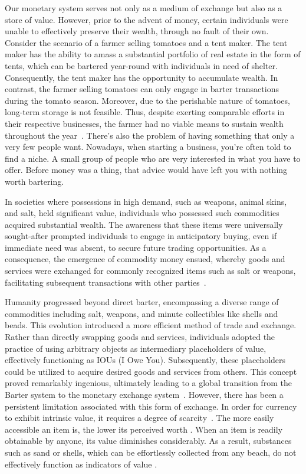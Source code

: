 Our monetary system serves not only as a medium of exchange but also as a store of value. However, prior to the advent of money, certain
individuals were unable to effectively preserve their wealth, through no fault of their own. Consider the scenario of a farmer selling tomatoes
and a tent maker. The tent maker has the ability to amass a substantial portfolio of real estate in the form of tents, which can be bartered
year-round with individuals in need of shelter. Consequently, the tent maker has the opportunity to accumulate wealth. In contrast, the farmer
selling tomatoes can only engage in barter transactions during the tomato season. Moreover, due to the perishable nature of tomatoes, long-term
storage is not feasible. Thus, despite exerting comparable efforts in their respective businesses, the farmer had no viable means to sustain
wealth throughout the year~\cite{de2016origins}. There's also the problem of having something that only a very few people want. Nowadays,
when starting a business, you're often told to find a niche. A small group of people who are very interested in what you have to offer. Before
money was a thing, that advice would have left you with nothing worth bartering.

In societies where possessions in high demand, such as weapons, animal skins, and salt, held significant value, individuals who possessed
such commodities acquired substantial wealth. The awareness that these items were universally sought-after prompted individuals to engage in
anticipatory buying, even if immediate need was absent, to secure future trading opportunities. As a consequence, the emergence of commodity
money ensued, whereby goods and services were exchanged for commonly recognized items such as salt or weapons, facilitating subsequent
transactions with other parties~\cite{polanyi1965trade}.

Humanity progressed beyond direct barter, encompassing a diverse range of commodities including salt, weapons, and minute collectibles like
shells and beads. This evolution introduced a more efficient method of trade and exchange. Rather than directly swapping goods and services,
individuals adopted the practice of using arbitrary objects as intermediary placeholders of value, effectively functioning as IOUs (I Owe You).
Subsequently, these placeholders could be utilized to acquire desired goods and services from others. This concept proved remarkably ingenious,
ultimately leading to a global transition from the Barter system to the monetary exchange system~\cite{graeber2012debt}. However, there has
been a persistent limitation associated with this form of exchange. In order for currency to exhibit intrinsic value, it requires a degree of
scarcity~\cite{smith2010wealth, ricardo1821principles}. The more easily accessible an item is, the lower its perceived worth
\cite{marshall2009principles}. When an item is readily obtainable by anyone, its value diminishes considerably. As a result, substances such
as sand or shells, which can be effortlessly collected from any beach, do not effectively function as indicators of value
\cite{principlesmenger, hicks1936keynes}.

